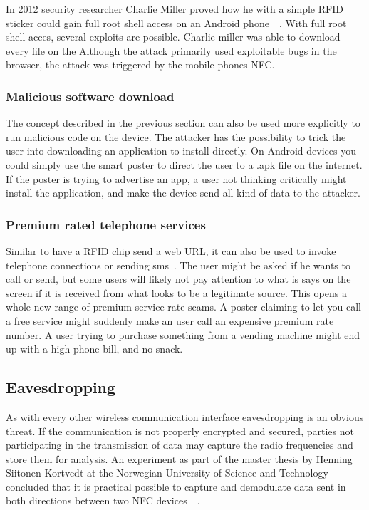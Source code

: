 \documentclass[a4paper,11pt]{article}
\begin{document}
In 2012 security researcher Charlie Miller proved how he with a simple RFID sticker could gain full root shell access on an Android phone~\cite{cmiller}~\cite{cmiller1}. With full root shell acces, several exploits are possible. Charlie miller was able to download every file on the  Although the attack primarily used exploitable bugs in the browser, the attack was triggered by the mobile phones NFC.

\subsubsection{Malicious software download}
The concept described in the previous section can also be used more explicitly to run malicious code on the device. The attacker has the possibility to trick the user into downloading an application to install directly. On Android devices you could simply use the smart poster to direct the user to a .apk file on the internet. If the poster is trying to advertise an app, a user not thinking critically might install the application, and make the device send all kind of data to the attacker.

\subsubsection{Premium rated telephone services}

Similar to have a RFID chip send a web URL, it can also be used to invoke telephone connections or sending sms~\cite{mulliner2009vulnerability}. The user might be asked if he wants to call or send, but some users will likely not pay attention to what is says on the screen if it is received from what looks to be a legitimate source. This opens a whole new range of premium service rate scams. A poster claiming to let you call a free service might suddenly make an user call an expensive premium rate number. A user trying to purchase something from a vending machine might end up with a high phone bill, and no snack.

\subsection{Eavesdropping}
As with every other wireless communication interface eavesdropping is an obvious threat. If the communication is not properly encrypted and secured, parties not participating in the transmission of data may capture the radio frequencies and store them for analysis. An experiment as part of the master thesis by Henning Siitonen Kortvedt at the Norwegian University of Science and Technology concluded that it is practical possible to capture and demodulate data sent in both directions between two NFC devices~\cite{kortvedt2009eavesdropping}~\cite{kortvedt2009securing}.
\end{document}
